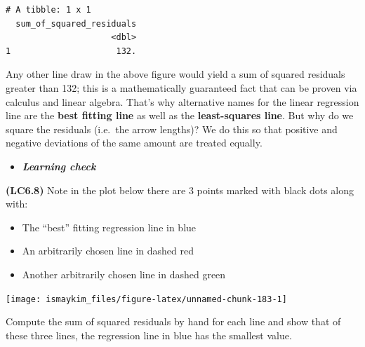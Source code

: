 \documentclass[12pt, krantz2,]{krantz}
\makeatletter
\newenvironment{Shaded}{\begin{snugshade}}{\end{snugshade}}
\newcommand{\CommentTok}[1]{\textcolor[rgb]{0.37,0.37,0.37}{\textit{#1}}}
\newcommand{\DataTypeTok}[1]{\textcolor[rgb]{0.27,0.27,0.27}{#1}}
\newcommand{\DecValTok}[1]{\textcolor[rgb]{0.06,0.06,0.06}{#1}}
\newcommand{\KeywordTok}[1]{\textcolor[rgb]{0.27,0.27,0.27}{\textbf{#1}}}
\newcommand{\NormalTok}[1]{#1}
\newcommand{\OperatorTok}[1]{\textcolor[rgb]{0.43,0.43,0.43}{\textbf{#1}}}
\newcommand{\StringTok}[1]{\textcolor[rgb]{0.5,0.5,0.5}{#1}}
\providecommand{\tightlist}{%
  \setlength{\itemsep}{0pt}\setlength{\parskip}{0pt}}
\newenvironment{kframe}{%
\medskip{}
\setlength{\fboxsep}{.8em}
 \def\at@end@of@kframe{}%
 \ifinner\ifhmode%
  \def\at@end@of@kframe{\end{minipage}}%
  \begin{minipage}{\columnwidth}%
 \fi\fi%
 \def\FrameCommand##1{\hskip\@totalleftmargin \hskip-\fboxsep
 \colorbox{shadecolor}{##1}\hskip-\fboxsep
     \hskip-\linewidth \hskip-\@totalleftmargin \hskip\columnwidth}%
 \MakeFramed {\advance\hsize-\width
   \@totalleftmargin\z@ \linewidth\hsize
   \@setminipage}}%
 {\par\unskip\endMakeFramed%
 \at@end@of@kframe}
\renewenvironment{Shaded}{\begin{kframe}}{\end{kframe}}
\newenvironment{rmdblock}[1]
  {\begin{shaded*}
  \begin{itemize}
  \renewcommand{\labelitemi}{
    \raisebox{-.7\height}[0pt][0pt]{
    }
  }
  \item
  }
  {
  \end{itemize}
  \end{shaded*}
  }
\newenvironment{learncheck}
  {\begin{rmdblock}{warning}}
  {\end{rmdblock}}
\makeatother
\begin{document}
\begin{Shaded}
\end{Shaded}

\begin{verbatim}
# A tibble: 1 x 1
  sum_of_squared_residuals
                     <dbl>
1                     132.
\end{verbatim}

Any other line draw in the above figure would yield a sum of squared residuals greater than 132; this is a mathematically guaranteed fact that can be proven via calculus and linear algebra. That's why alternative names for the linear regression line are the \textbf{best fitting line} as well as the \textbf{least-squares line}. But why do we square the residuals (i.e.~the arrow lengths)? We do this so that positive and negative deviations of the same amount are treated equally.

\begin{learncheck}
\textbf{\emph{Learning check}}
\end{learncheck}

\textbf{(LC6.8)} Note in the plot below there are 3 points marked with black dots along with:

\begin{itemize}
\tightlist
\item
  The ``best'' fitting regression line in blue
\item
  An arbitrarily chosen line in dashed red
\item
  Another arbitrarily chosen line in dashed green
\end{itemize}

\begin{center}\texttt{[image: ismaykim\_files/figure-latex/unnamed-chunk-183-1]} \end{center}

Compute the sum of squared residuals by hand for each line and show that of these three lines, the regression line in blue has the smallest value.
\end{document}
